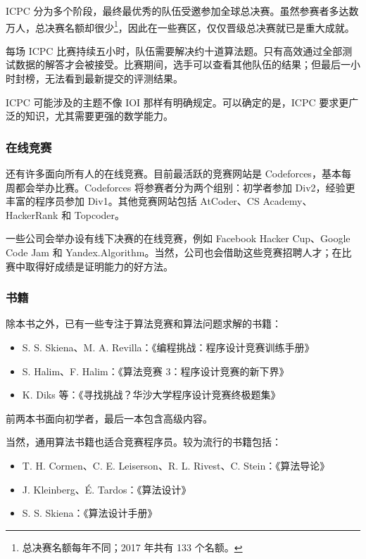ICPC 分为多个阶段，最终最优秀的队伍受邀参加全球总决赛。虽然参赛者多达数万人，总决赛名额却很少\footnote{总决赛名额每年不同；2017 年共有 133 个名额。}，因此在一些赛区，仅仅晋级总决赛就已是重大成就。

每场 ICPC 比赛持续五小时，队伍需要解决约十道算法题。只有高效通过全部测试数据的解答才会被接受。比赛期间，选手可以查看其他队伍的结果；但最后一小时封榜，无法看到最新提交的评测结果。

ICPC 可能涉及的主题不像 IOI 那样有明确规定。可以确定的是，ICPC 要求更广泛的知识，尤其需要更强的数学能力。

\subsubsection{在线竞赛}

还有许多面向所有人的在线竞赛。目前最活跃的竞赛网站是 Codeforces，基本每周都会举办比赛。Codeforces 将参赛者分为两个组别：初学者参加 Div2，经验更丰富的程序员参加 Div1。其他竞赛网站包括 AtCoder、CS Academy、HackerRank 和 Topcoder。

一些公司会举办设有线下决赛的在线竞赛，例如 Facebook Hacker Cup、Google Code Jam 和 Yandex.Algorithm。当然，公司也会借助这些竞赛招聘人才；在比赛中取得好成绩是证明能力的好方法。

\subsubsection{书籍}

除本书之外，已有一些专注于算法竞赛和算法问题求解的书籍：

\begin{itemize}
\item S. S. Skiena、M. A. Revilla：《编程挑战：程序设计竞赛训练手册》\cite{ski03}
\item S. Halim、F. Halim：《算法竞赛 3：程序设计竞赛的新下界》\cite{hal13}
\item K. Diks 等：《寻找挑战？华沙大学程序设计竞赛终极题集》\cite{dik12}
\end{itemize}

前两本书面向初学者，最后一本包含高级内容。

当然，通用算法书籍也适合竞赛程序员。较为流行的书籍包括：

\begin{itemize}
\item T. H. Cormen、C. E. Leiserson、R. L. Rivest、C. Stein：《算法导论》\cite{cor09}
\item J. Kleinberg、É. Tardos：《算法设计》\cite{kle05}
\item S. S. Skiena：《算法设计手册》\cite{ski08}
\end{itemize}

